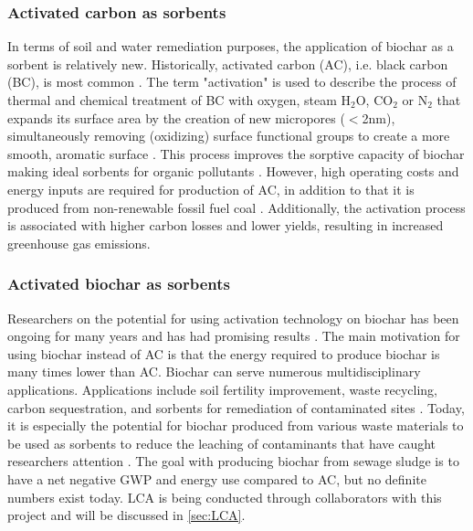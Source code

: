 \subsubsection{Activated carbon as sorbents}
In terms of soil and water remediation purposes, the application of biochar as a sorbent is relatively new. Historically, activated carbon (AC), i.e. black carbon (BC), is most common \citep{Cornelissen2005}. The term "activation" is used to describe the process of thermal and chemical treatment of BC with oxygen, steam $\mathrm{H_2O}$, $\mathrm{CO_2}$ or $\mathrm{N_2}$ that expands its surface area by the creation of new micropores ($<$2nm), simultaneously removing (oxidizing) surface functional groups to create a more smooth, aromatic surface \citep{sajjadi2019comprehensive}. This process improves the sorptive capacity of biochar making ideal sorbents for organic pollutants \citep{Ahmad2014}. However, high operating costs and energy inputs are required for production of AC, in addition to that it is produced from non-renewable fossil fuel coal \citep{Li2019}. Additionally, the activation process is associated with higher carbon losses and lower yields, resulting in increased greenhouse gas emissions.

\subsubsection{Activated biochar as sorbents}
Researchers on the potential for using activation technology on biochar has been ongoing for many years and has had promising results \citep{Sormo2021}. The main motivation for using biochar instead of AC is that the energy required to produce biochar is many times lower than AC. Biochar can serve numerous multidisciplinary applications. Applications include soil fertility improvement, waste recycling, carbon sequestration, and sorbents for remediation of contaminated sites \citep{Ahmad2014}. Today, it is especially the potential for biochar produced from various waste materials to be used as sorbents to reduce the leaching of contaminants that have caught researchers attention \citep{Cornelissen2011Capping, Kupryianchyk2016b, Sormo2021, zhou2010sorption}. The goal with producing biochar from sewage sludge is to have a net negative GWP and energy use compared to AC, but no definite numbers exist today. LCA is being conducted through collaborators with this project and will be discussed in \cref{sec:LCA}. 

